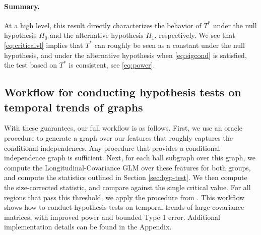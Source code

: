 \paragraph{Summary.} At a high level, this result directly characterizes the behavior of $T^*$ under the null hypothesis $H_0$ and 
the alternative hypothesis $H_1$, respectively. 
We see that \eqref{eq:criticalvl} implies that $T^*$ can roughly be seen as a constant under the null hypothesis, 
and under the alternative hypothesis when \eqref{eq:sigcond} is satisfied, the test based on $T^*$ is consistent, see \eqref{eq:power}. 

\subsection{Workflow for conducting hypothesis tests on temporal trends of graphs}
With these guarantees, our full workflow is as follows. First, we use an oracle procedure to generate a graph over our features 
that roughly captures the conditional independences. Any procedure that provides a conditional independence graph is sufficient. 
Next, for each ball subgraph over this graph, we compute the Longitudinal-Covariance GLM over these features for both groups, and compute the statistics outlined in Section \ref{sec:hyp-test}. We then compute the size-corrected statistic, and compare against the single critical value. For all regions that pass this threshold, we apply the procedure from \cite{jeng2010optimal}. This workflow shows how to conduct hypothesis tests on temporal trends of large covariance matrices, with improved 
power and bounded Type 1 error. Additional implementation details can be found in the Appendix.
